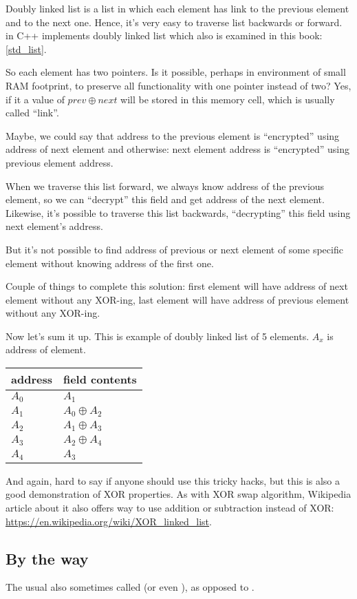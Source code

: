 Doubly linked list is a list in which each element has link to the previous element and to the next one.
Hence, it's very easy to traverse list backwards or forward.
 in C++ implements doubly linked list which also is examined in this book: \ref{std_list}.

So each element has two pointers.
Is it possible, perhaps in environment of small \ac{RAM} footprint, to preserve all functionality with one pointer instead of two?
Yes, if it a value of $prev \oplus next$ will be stored in this memory cell, which is usually called ``link''.

Maybe, we could say that address to the previous element is ``encrypted'' using address of next element and otherwise:
next element address is ``encrypted'' using previous element address.

When we traverse this list forward, we always know address of the previous element, so we can ``decrypt'' this field and get 
address of the next element.
Likewise, it's possible to traverse this list backwards, ``decrypting'' this field using next element's address.

But it's not possible to find address of previous or next element of some specific element without
knowing address of the first one.

Couple of things to complete this solution: first element will have address of next element without any XOR-ing,
last element will have address of previous element without any XOR-ing.

Now let's sum it up. This is example of doubly linked list of 5 elements.
$A_x$ is address of element.

\begin{center}
\begin{tabular}{ | l | l | }
	\hline
	\HeaderColor address & \HeaderColor \IT{link} field contents \\
	\hline
	$A_0$ & $A_1$ \\
	\hline
	$A_1$ & $A_0 \oplus A_2$ \\
	\hline
	$A_2$ & $A_1 \oplus A_3$ \\
	\hline
	$A_3$ & $A_2 \oplus A_4$ \\
	\hline
	$A_4$ & $A_3$ \\
	\hline
\end{tabular}
\end{center}

And again, hard to say if anyone should use this tricky hacks, but this is also a good demonstration of XOR properties.
As with XOR swap algorithm, Wikipedia article about it also offers way to use addition or subtraction instead of XOR:
\url{https://en.wikipedia.org/wiki/XOR_linked_list}.



\subsection{By the way}

The usual  also sometimes called  (or even ), as opposed to .

